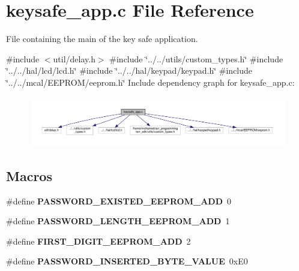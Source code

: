 \section{keysafe\+\_\+app.\+c File Reference}
\label{keysafe__app_8c}


File containing the main of the key safe application.  


{\ttfamily \#include $<$util/delay.\+h$>$}\newline
{\ttfamily \#include \char`\"{}../../utils/custom\+\_\+types.\+h\char`\"{}}\newline
{\ttfamily \#include \char`\"{}../../hal/lcd/lcd.\+h\char`\"{}}\newline
{\ttfamily \#include \char`\"{}../../hal/keypad/keypad.\+h\char`\"{}}\newline
{\ttfamily \#include \char`\"{}../../mcal/\+E\+E\+P\+R\+O\+M/eeprom.\+h\char`\"{}}\newline
Include dependency graph for keysafe\+\_\+app.\+c\+:\nopagebreak
\begin{figure}[H]
\begin{center}
\leavevmode
\includegraphics[width=350pt]{keysafe__app_8c__incl}
\end{center}
\end{figure}
\subsection*{Macros}
\begin{DoxyCompactItemize}
\item 
\#define \textbf{ P\+A\+S\+S\+W\+O\+R\+D\+\_\+\+E\+X\+I\+S\+T\+E\+D\+\_\+\+E\+E\+P\+R\+O\+M\+\_\+\+A\+DD}~0
\item 
\#define \textbf{ P\+A\+S\+S\+W\+O\+R\+D\+\_\+\+L\+E\+N\+G\+T\+H\+\_\+\+E\+E\+P\+R\+O\+M\+\_\+\+A\+DD}~1
\item 
\#define \textbf{ F\+I\+R\+S\+T\+\_\+\+D\+I\+G\+I\+T\+\_\+\+E\+E\+P\+R\+O\+M\+\_\+\+A\+DD}~2
\item 
\#define \textbf{ P\+A\+S\+S\+W\+O\+R\+D\+\_\+\+I\+N\+S\+E\+R\+T\+E\+D\+\_\+\+B\+Y\+T\+E\+\_\+\+V\+A\+L\+UE}~0x\+E0
\end{DoxyCompactItemize}
